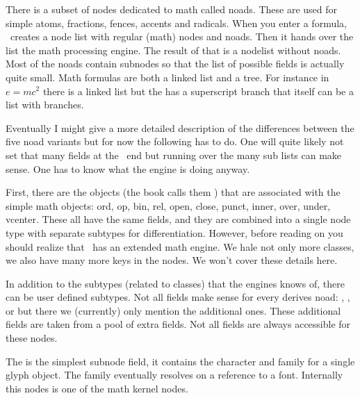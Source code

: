 There is a subset of nodes dedicated to math called noads. These are used for
simple atoms, fractions, fences, accents and radicals. When you enter a formula,
\TEX\ creates a node list with regular (math) nodes and noads. Then it hands over
the list the math processing engine. The result of that is a nodelist without
noads. Most of the noads contain subnodes so that the list of possible fields is
actually quite small. Math formulas are both a linked list and a tree. For
instance in $e = mc^2$ there is a linked list  but the 
has a superscript branch that itself can be a list with branches.

Eventually I might give a more detailed description of the differences between
the five noad variants but for now the following has to do. One will quite likely
not set that many fields at the \LUA\ end but running over the many sub lists can
make sense. One has to know what the engine is doing anyway.

\stopsubsection

\startsubsection[title=noad]

First, there are the objects (the \TEX book calls them ) that are
associated with the simple math objects: ord, op, bin, rel, open, close, punct,
inner, over, under, vcenter. These all have the same fields, and they are
combined into a single node type with separate subtypes for differentiation.
However, before reading on you should realize that \LUAMETATEX\ has an extended
math engine. We hale not only more classes, we also have many more keys in the
nodes. We won't cover these details here.


In addition to the subtypes (related to classes) that the engines knows of, there
can be user defined subtypes. Not all fields make sense for every derives noad:
, ,  or  but there we
(currently) only mention the additional ones. These additional fields are taken
from a pool of extra fields. Not all fields are always accessible for these nodes.


\stopsubsection

\startsubsection[title=mathchar]

The  is the simplest subnode field, it contains the character and
family for a single glyph object. The family eventually resolves on a reference
to a font. Internally this nodes is one of the math kernel nodes.

